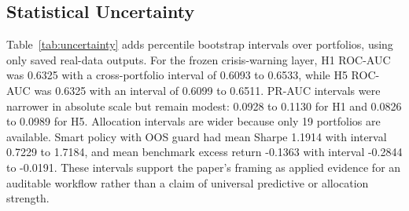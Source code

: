 \documentclass{ieeeaccess}
\begin{document}
\subsection{Statistical Uncertainty}
Table~\ref{tab:uncertainty} adds percentile bootstrap intervals over portfolios, using only saved real-data outputs. For the frozen crisis-warning layer, H1 ROC-AUC was 0.6325 with a cross-portfolio interval of 0.6093 to 0.6533, while H5 ROC-AUC was 0.6325 with an interval of 0.6099 to 0.6511. PR-AUC intervals were narrower in absolute scale but remain modest: 0.0928 to 0.1130 for H1 and 0.0826 to 0.0989 for H5. Allocation intervals are wider because only 19 portfolios are available. Smart policy with OOS guard had mean Sharpe 1.1914 with interval 0.7229 to 1.7184, and mean benchmark excess return -0.1363 with interval -0.2844 to -0.0191. These intervals support the paper's framing as applied evidence for an auditable workflow rather than a claim of universal predictive or allocation strength.
\end{document}
